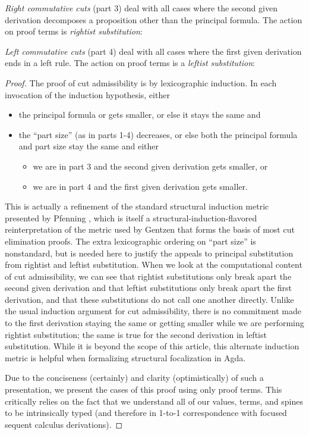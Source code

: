 \documentclass[acmtocl]{robtrans}\pdfoutput=1
\begin{document}
{\it Right commutative cuts} (part 3) deal with all cases where the
second given derivation decomposes a proposition other than the
principal formula. The action on proof terms is {\it rightist
  substitution}:


{\it Left commutative cuts} (part 4) deal with all cases where the
first given derivation ends in a left rule. The action on proof terms
is a {\it leftist substitution}: 


\begin{proof}
The proof of cut admissibility is by lexicographic induction. In each
invocation of the induction hypothesis, either
\begin{itemize}
\item the principal formula  or  
gets smaller, or else it stays the same 
and
\item the ``part size'' (as in parts 1-4) decreases, or else both the
  principal formula and part size stay the same and either
\begin{itemize}
\item we are in part 3 and the second given derivation gets smaller,
  or
\item we are in part 4 and the first given derivation gets smaller.
\end{itemize}
\end{itemize}
This is actually a refinement of the standard structural induction
metric presented by Pfenning , which
is itself a structural-induction-flavored reinterpretation of the
metric used by Gentzen  that forms
the basis of most cut elimination proofs. The
extra lexicographic ordering on ``part size'' is nonstandard, but is
needed here to justify the appeals to principal substitution
from rightist and leftist substitution.  When we look at the
computational content of cut admissibility, we can see that rightist
substitutions only break apart the second given derivation and that
leftist substitutions only break apart the first derivation, and that
these substitutions do not call one another directly. Unlike the usual
induction argument for cut admissibility, there is no commitment made
to the first derivation staying the same or getting smaller
while we are performing rightist substitution; the same is true for
the second derivation in leftist substitution. While it is beyond the
scope of this article, this alternate induction metric is helpful
when formalizing structural focalization in Agda.

Due to the conciseness (certainly) and clarity (optimistically) of
such a presentation, we present the cases of this proof using only
proof terms. This critically relies on the fact that we
understand all of our values, terms, and spines to be intrinsically
typed (and therefore in 1-to-1 correspondence with focused sequent
calculus derivations).


\end{proof}
\end{document}
